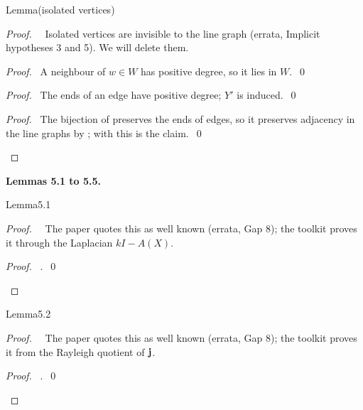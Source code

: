 \begin{namedresult}{Lemma}{(isolated vertices)}\label{lem:isolated}
\end{namedresult}
\begin{proof}
 \pfsketch\ \repair\ Isolated vertices are invisible to the line graph (errata, Implicit
 hypotheses 3 and 5). We will delete them.
 \begin{proof}\pf\ A neighbour of $w\in W$ has positive degree, so it lies in $W$.~\qed\end{proof}
 \begin{proof}\pf\ The ends of an edge have positive degree; $Y'$ is induced.~\qed\end{proof}
 \qedstep
 \begin{proof}\pf\ The bijection of  preserves the ends of edges, so it
  preserves adjacency in the line graphs by ; with
   this is the claim.~\qed\end{proof}
\end{proof}

\medskip\noindent\textbf{Lemmas 5.1 to 5.5.}

\begin{cgss}{Lemma}{5.1}\label{lem:5.1}
\end{cgss}
\begin{proof}
 \pfsketch\ \repair\ The paper quotes this as well known (errata, Gap 8); the toolkit proves it
 through the Laplacian $kI-A(X)$.
 \qedstep
 \begin{proof}\pf\ .~\qed\end{proof}
\end{proof}

\begin{cgss}{Lemma}{5.2}\label{lem:5.2}
\end{cgss}
\begin{proof}
 \pfsketch\ \repair\ The paper quotes this as well known (errata, Gap 8); the toolkit proves it
 from the Rayleigh quotient of ${\mathbf j}$.
 \qedstep
 \begin{proof}\pf\ .~\qed\end{proof}
\end{proof}

